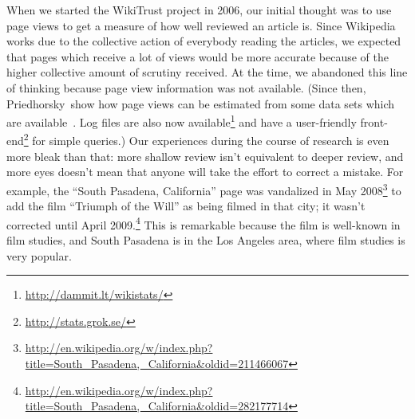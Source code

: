 When we started the WikiTrust project in 2006, our initial thought was to
use page views to get a measure of how well reviewed an article is.
Since Wikipedia works due to the collective action of everybody
reading the articles, we expected that pages which receive a lot of
views would be more accurate because of the higher collective amount
of scrutiny received.
At the time, we abandoned this line of thinking because page view
information was not available.
(Since then, Priedhorsky~\etal show how page views can be estimated
from some data sets which are available~\cite{Priedhorsky2007}.
Log files are also now
available\footnote{\url{http://dammit.lt/wikistats/}} and
have a user-friendly front-end\footnote{\url{http://stats.grok.se/}}
for simple queries.)
Our experiences during the course of research is even more
bleak than that: more shallow review isn't equivalent to
deeper review, and more eyes doesn't mean that anyone will take
the effort to correct a mistake.
For example, the ``South Pasadena, California'' page was vandalized
in May 2008\footnote{\url{http://en.wikipedia.org/w/index.php?title=South_Pasadena,_California&oldid=211466067}}
to add the film ``Triumph of the Will'' as being filmed in that city;
it wasn't corrected until
April 2009.\footnote{\url{http://en.wikipedia.org/w/index.php?title=South_Pasadena,_California&oldid=282177714}}
This is remarkable because the film is well-known in film studies,
and South Pasadena is in the Los Angeles area,
where film studies is very popular.

